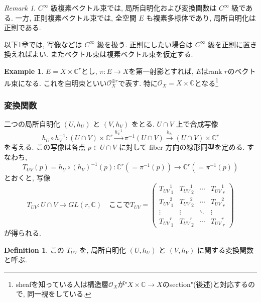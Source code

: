 \documentclass[dvipdfmx,a4paper,11pt]{article} %
\theoremstyle{definition}
\newtheorem{defn}[thm]{Definition}
\newtheorem{example}[thm]{Example}
\theoremstyle{remark}
\newtheorem{remark}[thm]{Remark}
\numberwithin{equation}{section}
\newcommand{\C}{\mathbb{C}}
\begin{document}
\begin{remark}
\(C^\infty\) 級複素ベクトル束では, 局所自明化および変換関数は \(C^\infty\) 級である. 一方, 正則複素ベクトル束では, 全空間 \(E\) も複素多様体であり, 局所自明化は正則である.
\end{remark}

\begin{tcolorbox}[mybox]
以下1章では, 写像などは \(C^{\infty}\) 級を扱う. 正則にしたい場合は \(C^{\infty}\) 級を正則に置き換えればよい. またベクトル束は複素ベクトル束を仮定する. 
\end{tcolorbox}

\begin{example}
$E=X \times \C^r$とし, $\pi : E \to X$を第一射影とすれば, $E$はrank $r$のベクトル束になる. 
これを自明束といい$\mathcal{O}_X^{\oplus r}$で表す. 特に$\mathcal{O}_X=X \times \C$となる\footnote{sheafを知っている人は構造層$\mathcal{O}_X$が"$X \times \C \to X$のsection"(後述)と対応するので, 同一視をしている. }

\end{example}

\subsubsection{変換関数}

二つの局所自明化 \((U,h_U)\) と \((V,h_V)\) をとる. \(U\cap V\) 上で合成写像
\[
h_U\circ h_V^{-1}\colon (U\cap V)\times \mathbb{C}^r 
\overset{h_V^{-1}}{\longrightarrow} 
\pi^{-1}(U \cap V)
\overset{h_U}{\longrightarrow} 
(U\cap V)\times\mathbb{C}^r
\]
を考える. この写像は各点 \(p\in U\cap V\) に対して fiber 方向の線形同型を定める. すなわち,
\[
T_{UV}(p)
=h_U\circ (h_V)^{-1}(p)
\colon \mathbb{C}^r(=\pi^{-1}(p))\longrightarrow \mathbb{C}^r(=\pi^{-1}(p))
\]
とおくと, 写像
\begin{equation}
T_{UV}\colon U\cap V\longrightarrow GL(r,\mathbb{C})
\quad
\text{ここで}
T_{UV}
=
\begin{pmatrix}
{T_{UV}}^{1}_{\ 1} & {T_{UV}}^{1}_{\ 2}& \cdots & {T_{UV}}^{1}_{\ r}\\
{T_{UV}}^{2}_{\ 1} & {T_{UV}}^{2}_{\ 2}& \cdots & {T_{UV}}^{2}_{\ r}\\
\vdots & \vdots & \ddots & \vdots\\
{T_{UV}}^{r}_{\ 1}& {T_{UV}}^{r}_{\ 2}& \cdots & {T_{UV}}^{r}_{\ r}
\end{pmatrix}
\end{equation}
が得られる. 
\begin{defn}
この \(T_{UV}\) を, 局所自明化 \((U,h_U)\) と \((V,h_V)\) に関する変換関数と呼ぶ.
\end{defn}
\end{document}
